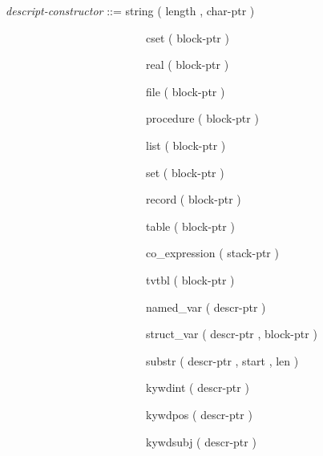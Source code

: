 {\ttfamily\mdseries
\ \ \ \textit{descript-constructor} ::= string ( length , char-ptr ) {\textbar}}

{\ttfamily\mdseries
\ \ \ \ \ \ \ \ \ \ \ \ \ \ \ \ \ \ \ \ \ \ \ \ \ \ \ \ cset ( block-ptr ) {\textbar}}

{\ttfamily\mdseries
\ \ \ \ \ \ \ \ \ \ \ \ \ \ \ \ \ \ \ \ \ \ \ \ \ \ \ \ real ( block-ptr ) {\textbar}}

{\ttfamily\mdseries
\ \ \ \ \ \ \ \ \ \ \ \ \ \ \ \ \ \ \ \ \ \ \ \ \ \ \ \ file ( block-ptr ) {\textbar}}

{\ttfamily\mdseries
\ \ \ \ \ \ \ \ \ \ \ \ \ \ \ \ \ \ \ \ \ \ \ \ \ \ \ \ procedure ( block-ptr ) {\textbar}}

{\ttfamily\mdseries
\ \ \ \ \ \ \ \ \ \ \ \ \ \ \ \ \ \ \ \ \ \ \ \ \ \ \ \ list ( block-ptr ) {\textbar}}

{\ttfamily\mdseries
\ \ \ \ \ \ \ \ \ \ \ \ \ \ \ \ \ \ \ \ \ \ \ \ \ \ \ \ set ( block-ptr ) {\textbar}}

{\ttfamily\mdseries
\ \ \ \ \ \ \ \ \ \ \ \ \ \ \ \ \ \ \ \ \ \ \ \ \ \ \ \ record ( block-ptr ) {\textbar}}

{\ttfamily\mdseries
\ \ \ \ \ \ \ \ \ \ \ \ \ \ \ \ \ \ \ \ \ \ \ \ \ \ \ \ table ( block-ptr ) {\textbar}}

{\ttfamily\mdseries
\ \ \ \ \ \ \ \ \ \ \ \ \ \ \ \ \ \ \ \ \ \ \ \ \ \ \ \ co\_expression ( stack-ptr ) {\textbar}}

{\ttfamily\mdseries
\ \ \ \ \ \ \ \ \ \ \ \ \ \ \ \ \ \ \ \ \ \ \ \ \ \ \ \ tvtbl ( block-ptr ) {\textbar}}

{\ttfamily\mdseries
\ \ \ \ \ \ \ \ \ \ \ \ \ \ \ \ \ \ \ \ \ \ \ \ \ \ \ \ named\_var ( descr-ptr ) {\textbar}}

{\ttfamily\mdseries
\ \ \ \ \ \ \ \ \ \ \ \ \ \ \ \ \ \ \ \ \ \ \ \ \ \ \ \ struct\_var ( descr-ptr , block-ptr ) {\textbar}}

{\ttfamily\mdseries
\ \ \ \ \ \ \ \ \ \ \ \ \ \ \ \ \ \ \ \ \ \ \ \ \ \ \ \ substr ( descr-ptr , start , len ) {\textbar}}

{\ttfamily\mdseries
\ \ \ \ \ \ \ \ \ \ \ \ \ \ \ \ \ \ \ \ \ \ \ \ \ \ \ \ kywdint ( descr-ptr ) {\textbar}}

{\ttfamily\mdseries
\ \ \ \ \ \ \ \ \ \ \ \ \ \ \ \ \ \ \ \ \ \ \ \ \ \ \ \ kywdpos ( descr-ptr ) {\textbar}}

{\ttfamily\mdseries
\ \ \ \ \ \ \ \ \ \ \ \ \ \ \ \ \ \ \ \ \ \ \ \ \ \ \ \ kywdsubj ( descr-ptr )}


